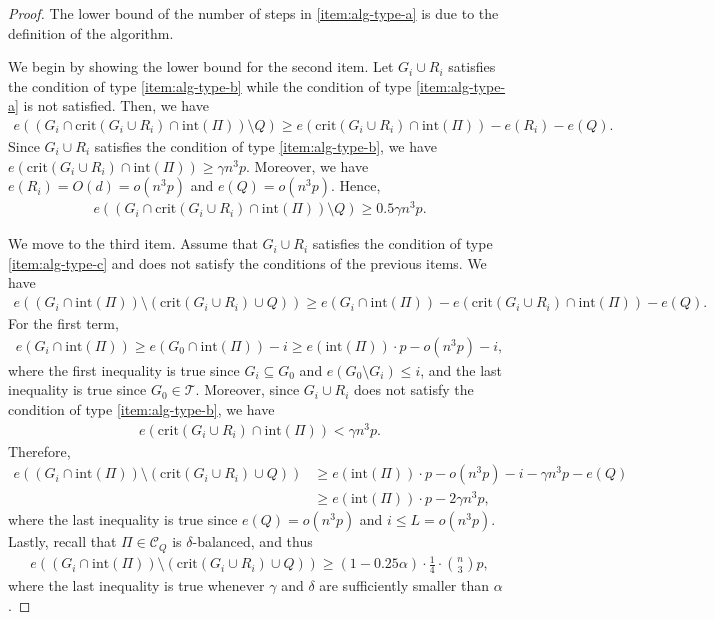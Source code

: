 \documentclass[11pt,a4paper,oneside,reqno]{amsart}
\newcommand{\cC}{\mathcal{C}}
\newcommand{\cT}{\mathcal{T}}
\newcommand{\1}{\mathbbm{1}} %
\renewcommand{\le}{\leqslant}
\renewcommand{\ge}{\geqslant}
\renewcommand{\int}{\mathrm{int}}
\newcommand{\crit}{\mathrm{crit}}
\begin{document}
\begin{proof}
    The lower bound of the number of steps in \ref{item:alg-type-a} is due to the definition of the algorithm.

    We begin by showing the lower bound for the second item. Let $G_i \cup R_i$ satisfies the condition of type \ref{item:alg-type-b} while the condition of type \ref{item:alg-type-a} is not satisfied. Then, we have
    \begin{align*}
        e\left(\left(G_i \cap \crit(G_i \cup R_i) \cap \int(\Pi)\right) \setminus Q\right) \ge e(\crit(G_i \cup R_i) \cap \int(\Pi)) - e(R_i) - e(Q).
    \end{align*}
    Since $G_i \cup R_i$ satisfies the condition of type \ref{item:alg-type-b}, we have $e(\crit(G_i \cup R_i) \cap \int(\Pi)) \ge \gamma n^3 p$. Moreover, we have $e(R_i) = O(d) = o(n^3 p)$ and $e(Q) = o(n^3 p)$. Hence,
    \begin{align*}
        e\left(\left(G_i \cap \crit(G_i \cup R_i) \cap \int(\Pi)\right) \setminus Q\right) \ge 0.5 \gamma n^3 p.
    \end{align*}

    We move to the third item. Assume that $G_i \cup R_i$ satisfies the condition of type \ref{item:alg-type-c} and does not satisfy the conditions of the previous items. We have
    \begin{align*}
        e\left((G_i \cap \int(\Pi)) \setminus (\crit(G_i \cup R_i) \cup Q)\right) \ge e\left(G_i \cap \int(\Pi)\right) - e\left(\crit(G_i \cup R_i) \cap \int(\Pi)\right) - e(Q).
    \end{align*}
    For the first term, 
    \begin{align*}
        e(G_i \cap \int(\Pi)) \ge e(G_0 \cap \int(\Pi)) - i \ge e(\int(\Pi)) \cdot p - o(n^3 p) - i,
    \end{align*}
    where the first inequality is true since $G_i \subseteq G_0$ and $e(G_0 \setminus G_i) \le i$, and the last inequality is true since $G_0 \in \cT$. Moreover, since $G_i \cup R_i$ does not satisfy the condition of type \ref{item:alg-type-b}, we have
    \begin{align*}
        e(\crit(G_i \cup R_i) \cap \int(\Pi)) < \gamma n^3 p.
    \end{align*}
    Therefore,
    \begin{align*}
        e\left((G_i \cap \int(\Pi)) \setminus (\crit(G_i \cup R_i) \cup Q)\right) &\ge e(\int(\Pi)) \cdot p - o(n^3 p) - i - \gamma n^3 p - e(Q) \\
        &\ge e(\int(\Pi)) \cdot p - 2\gamma n^3 p,
    \end{align*}
    where the last inequality is true since $e(Q) = o(n^3 p)$ and $i \le L = o(n^3 p)$. Lastly, recall that $\Pi \in \cC_Q$ is $\delta$-balanced, and thus
    \begin{align*}
        e\left((G_i \cap \int(\Pi)) \setminus (\crit(G_i \cup R_i) \cup Q)\right) \ge \left(1 - 0.25\alpha\right) \cdot \frac{1}{4} \cdot \binom{n}{3} p,
    \end{align*}
    where the last inequality is true whenever $\gamma$ and $\delta$ are sufficiently smaller than $\alpha$.


\end{proof}
\end{document}
